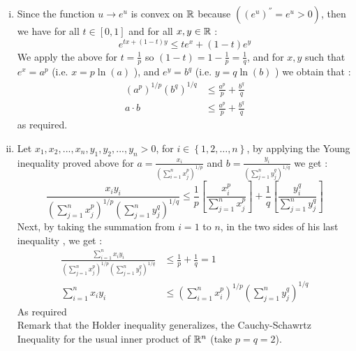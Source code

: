 \begin{enumerate}[(i)]
	\item 
		Since the function 
		$u \rightarrow e^{u}$  is 
		convex on $\mathbb{R} $ because
		$\left( (e^{u})^{''} = 
		e^{u} > 0\right)$, then 
		we have for all  
		$t \in [0,1]$  and for all
		$x,y \in \mathbb{R} $  :
		\[
			e^{tx + \left( 1-t \right)y} \leq 
			te^{x}  + 
			\left( 1-t \right)e^{y}
		\]
		We apply the above for 
		$t = \frac{1}{p}$  so 
		$\left( 1-t \right) = 1 - 
		\frac{1}{p} = \frac{1}{q}$, and for 
		$x,y$ such that 
		$e^{x} = a ^{p}$ (i.e. 
		$x = p \ln{\left( a \right)}$ ), and 
		$e^{y} = b ^{q}$  (i.e. 
		$y = q \ln{\left( b \right)}$ ) we obtain
		that : 
		\begin{align*}
		\left( a ^{p} \right)^{1/p} 
		\left( b ^{q} \right)^{1/q} 
		&\leq  
		\frac{a ^{p}}{p} + 
		\frac{b^{q}}{q} \\
			a \cdot b & \leq 
		\frac{a ^{p}}{p} + 
		\frac{b^{q}}{q} 
		\end{align*}
		as required.
	\item Let 
		$x_1,x_2, ..., x_{n}, 
		y_1,y_2, ..., y_{n} >  0$,
		for $i \in \left\{ 
			1,2, \hdots , n
		\right\}$, by applying 
		the Young inequality 
		proved above for 
		$a = \frac{x_{i}}{
		(\sum_{i=1}^{n} x_{j}^{p})^{1/p}}$ 
		and $b = 
		\frac{y_{i}}{
			\left( 
				\sum_{j=1}^{n} 
				y_{j}^{q}
			\right)^{1/q}
		}
		$
		we get : 
	\[
	\frac{x_{i}y_{i}}{
		\left( 
			\sum_{j = 1}^{n}  
			x_{j}^{p}
		\right)^{1/p}
		\left( 
			\sum_{j=1}^{n} 
			y_{j}^{q}
		\right)^{1/q} 
	}                      
	\leq 
		\frac{1}{p}
		\left[ 
		\frac{x_{i}^{p}}{
		\sum_{j=1}^{n} 
	x_{j}^{p}} 
		\right]
		+ 
		\frac{1}{q}
		\left[ 
			\frac{y_{i}^{q}}{
				\sum_{j=1}^{n} 
				y_{j}^{q}
			}
		\right]
	\]
	Next, by taking the summation from 
	$i=1$ to $n$, in the two sides of his last inequality
	, we get : 
	\begin{align*}
	\frac{\sum_{i=1}^{n} 
x_{i}y_{i}}{
\left( 
	\sum_{j=1}^{n} 
	x_{j}^{p}
\right)^{1/p} 
\left( 
	\sum_{j=1}^{n} 
	y_{j}^{q}
\right)^{1/q}
}
&\leq 
\frac{1}{p} + 
\frac{1}{q} = 1 \\
\sum_{i=1}^{n} 
       x_{i}y_{i} & \leq 
       \left( 
	       \sum_{i=1}^{n} 
	       x_{i}^{p}
       \right)^{1/p} 
       \left( 
	       \sum_{j=1}^{n} 
	       y_{j}^{q}
       \right)^{1/q}
	\end{align*}
	As required\\
	Remark that the Holder inequality
generalizes, the Cauchy-Schawrtz Inequality for 
the usual inner product of $\mathbb{R}^n$ (take $p=q=2$).

\end{enumerate}
